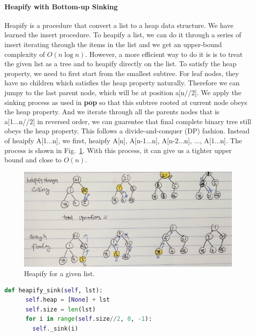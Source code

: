 \documentclass[main.tex]{subfiles}
\begin{document}
\paragraph{Heapify with Bottom-up Sinking}  Heapify is a procedure that convert a list to a heap data structure.  We have learned the insert procedure. To heapify a list, we can do it through a series of insert iterating through the items in the list and we get an upper-bound complexity of $O(n\log n)$. However, a more efficient way to do it is is to treat the given list as a tree and to heapify directly on the list. %
To satisfy the heap property, we need to first start from the smallest subtree. For leaf nodes, they have no children which satisfies the heap property naturally. Therefore we can jumpy to the last parent node, which will be at position a[n//2]. We apply the sinking process as used in \textbf{pop} so that this subtree rooted at current node obeys the heap property. And we   iterate through all the parents nodes that is a[1...n//2] in reversed order, we can guarentee that final complete binary tree still obeys the heap property. This follows a divide-and-conquer (DP) fashion. Instead of heaipfy A[1...n], we first, heaipfy A[n], A[n-1...n], A[n-2...n], ..., A[1...n].  The process is shown in Fig.~\ref{fig:heapify}. With this process, it can give us a tighter upper bound and close to $O(n)$. 
\begin{figure}[h!]
    \centering
    \includegraphics[width = 0.98\columnwidth]{fig/heapify.png}
    \caption{Heapify for a given list.}
    \label{fig:heapify}
\end{figure}
\begin{lstlisting}[language=Python]
  def heapify_sink(self, lst):
      self.heap = [None] + lst
      self.size = len(lst)
      for i in range(self.size//2, 0, -1):
        self._sink(i)
\end{lstlisting}
\end{document}
